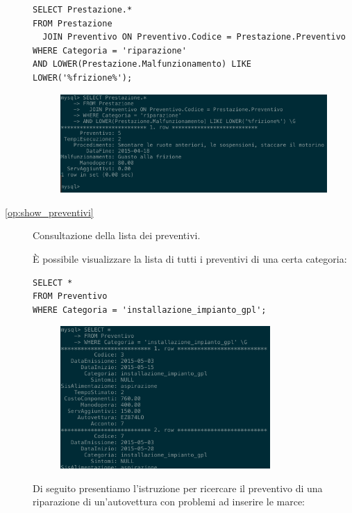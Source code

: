 \begin{description}
              \begin{lstlisting}
SELECT Prestazione.*
FROM Prestazione
  JOIN Preventivo ON Preventivo.Codice = Prestazione.Preventivo
WHERE Categoria = 'riparazione'
AND LOWER(Prestazione.Malfunzionamento) LIKE LOWER('%frizione%');
              \end{lstlisting}

              \begin{figure}[H]
                \centering
                \includegraphics[width=12cm]{images/screenshots/search_riparazioni.png}
              \end{figure}

            \item[\ref{op:show_preventivi}] Consultazione della lista dei preventivi.

            È possibile visualizzare la lista di tutti i preventivi di una certa categoria:

              \begin{lstlisting}
SELECT *
FROM Preventivo
WHERE Categoria = 'installazione_impianto_gpl';
              \end{lstlisting}

              \begin{figure}[H]
                \centering
                \includegraphics[width=8cm]{images/screenshots/search_preventivi_1.png}
              \end{figure}

            Di seguito presentiamo l'istruzione per ricercare il preventivo di una riparazione di un'autovettura con problemi ad inserire le marce:


\end{description}
